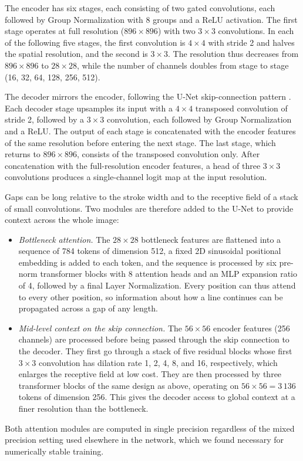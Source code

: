 \documentclass[pdflatex,sn-mathphys-num]{sn-jnl}%
\begin{document}
The encoder has six stages, each consisting of two gated convolutions, each
followed by Group Normalization \citep{wu2018groupnorm} with 8 groups and a ReLU
activation. The first stage operates at full resolution ($896\times 896$) with two
$3\times 3$ convolutions. In each of the following five stages, the first
convolution is $4\times 4$ with stride 2 and halves the spatial resolution, and the
second is $3\times 3$. The resolution thus decreases from $896\times 896$ to
$28\times 28$, while the number of channels doubles from stage to stage (16, 32, 64,
128, 256, 512). 

The decoder mirrors the encoder, following the U-Net skip-connection pattern
\citep{ronneberger2015unet}. Each decoder stage upsamples its input with a
$4\times 4$ transposed convolution of stride 2, followed by a $3\times 3$
convolution, each followed by Group Normalization and a ReLU. The output of each
stage is concatenated with the encoder features of the same resolution before
entering the next stage. The last stage, which returns to $896\times 896$, consists
of the transposed convolution only. After concatenation with the full-resolution
encoder features, a head of three $3\times 3$ convolutions produces a
single-channel logit map at the input resolution.  

Gaps can be long relative to the stroke width and to the receptive field of a stack
of small convolutions. Two modules are therefore added to the U-Net to provide
context across the whole image:
\begin{itemize}
\item \emph{Bottleneck attention.} The $28\times 28$ bottleneck features are
  flattened into a sequence of 784 tokens of dimension 512, a fixed 2D sinusoidal
  positional embedding is added to each token, and the sequence is processed by six
  pre-norm transformer blocks \citep{vaswani2017attention} with 8 attention heads
  and an MLP expansion ratio of 4, followed by a final Layer Normalization. Every
  position can thus attend to every other position, so information about how a
  line continues can be propagated across a gap of any length.
\item \emph{Mid-level context on the skip connection.} The $56\times 56$ encoder
  features (256 channels) are processed before being passed through the skip
  connection to the decoder. They first go through a stack of five residual blocks
  whose first $3\times 3$ convolution has dilation rate 1, 2, 4, 8, and 16,
  respectively, which enlarges the receptive field at low cost. They are then
  processed by three transformer blocks of the same design as above, operating on
  $56\times 56 = 3\,136$ tokens of dimension 256. This gives the decoder access to
  global context at a finer resolution than the bottleneck.
\end{itemize}
Both attention modules are computed in single precision regardless of the mixed
precision setting used elsewhere in the network, which we found necessary for
numerically stable training.
\end{document}
